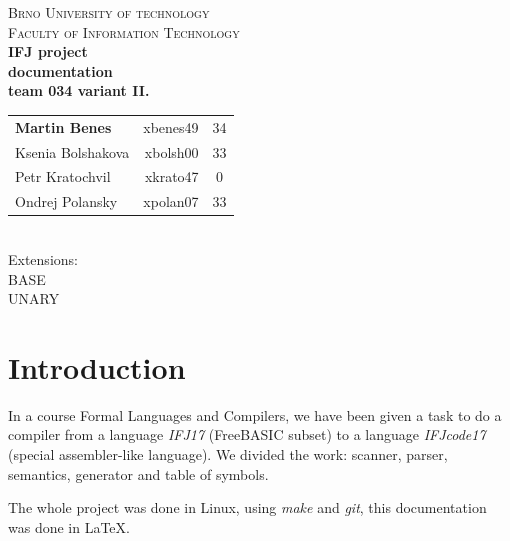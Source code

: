 \documentclass[10pt,a4paper,titlepage]{article}
\begin{document}
\begin{titlepage}

\begin{center}
\textsc{\LARGE Brno University of technology}\\[0.5cm]
\textsc{\large Faculty of Information Technology}\\[7cm]

{ \huge \bfseries IFJ project}\\[0.3cm]
{ \Large \bfseries documentation}\\[0.5cm]
{ \bfseries team 034 variant II.}\\[1cm]

\begin{tabular}{  l | r | c }
  {\bf Martin Benes} & xbenes49 & 34 \\
  Ksenia Bolshakova  & xbolsh00 & 33 \\
  Petr Kratochvil    & xkrato47 & 0  \\
  Ondrej Polansky    & xpolan07 & 33 \\
\end{tabular}
\\[4cm]
Extensions: \\
BASE \\
UNARY
\end{center}

\end{titlepage}
\newpage


\setcounter{page}{1}

\section{Introduction}
\begin{justify}
In a course Formal Languages and Compilers, we have been given a task to do
a compiler from a language {\it IFJ17} (FreeBASIC subset) to a language
{\it IFJcode17} (special assembler-like language). We divided the work:
scanner, parser, semantics, generator and table of symbols.

The whole project was done in Linux, using {\it make} and {\it git}, this
documentation was done in \LaTeX.
\end{justify}
\end{document}
